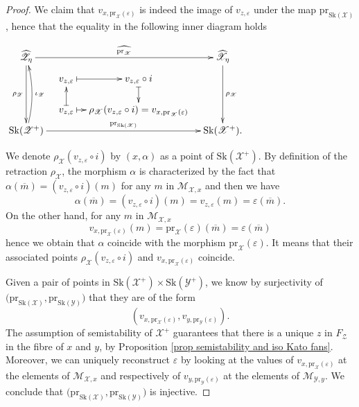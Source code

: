 \documentclass{amsart}%
\numberwithin{equation}{subsection}
\theoremstyle{plain2}
\theoremstyle{definition2}
\theoremstyle{stepstyle}
\theoremstyle{point}
\theoremstyle{subpoint}
\newcommand{\cX}{\ensuremath{\mathscr{X}}}
\newcommand{\caM}{\ensuremath{\mathcal{M}}}
\newcommand{\cY}{\ensuremath{\mathscr{Y}}}
\newcommand{\cZ}{\ensuremath{\mathscr{Z}}}
\renewcommand{\cZ}{\ensuremath{\mathscr{Z}}}
\renewcommand{\cY}{\ensuremath{\mathscr{Y}}}
\newcommand{\pr}{\mathrm{pr}}
\newcommand{\Sk}{\mathrm{Sk}}
\begin{document}
\begin{proof}
We claim that $v_{x, \pr_{\cX}(\varepsilon)}$ is indeed the image of $v_{z,\varepsilon}$ under the map $\pr_{\Sk(\cX)}$, hence that the equality in the following inner diagram holds
\begin{center} 
$\begin{gathered}
\xymatrixcolsep{0.8pc}\xymatrixrowsep{0.4pc} \xymatrix{
 \widehat{\cZ_{\eta}} \ar[rrr]^-{\widehat{\pr_{\cX}}} \ar[dddd]_{\rho_\cZ} & & & \widehat{\cX_{\eta}}\ar[dddd]^{\rho_\cX}\\
 \footnotesize & v_{z,\varepsilon} \ar@{|->}[r] &  v_{z,\varepsilon} \circ i\ar@{|->}[dd] & \\
 & & & \\
 & v_{z,\varepsilon} \ar@{|->}[uu] \ar@{|->}[r] & \rho_\cX(v_{z,\varepsilon} \circ i) = v_{x, \pr_{\cX}(\varepsilon)}& \\
 \normalsize \Sk(\cZ^+) \ar[rrr]^-{\pr_{\Sk(\cX)}} \ar@/_/[uuuu]_-{\iota_\cZ}  & & & \Sk(\cX^+).
}
\end{gathered}$\end{center} We denote $\rho_\cX(v_{z,\varepsilon} \circ i)$ by $(x,\alpha)$ as a point of $\Sk(\cX^+)$. By definition of the retraction $\rho_\cX$, the morphism $\alpha$ is characterized by the fact that $\alpha(\overline{m})= (v_{z,\varepsilon} \circ i )(m)$ for any $m$ in $\caM_{\cX,x}$ and then we have $$\alpha(\overline{m})= (v_{z,\varepsilon} \circ i )(m) = v_{z,\varepsilon}(m)= \varepsilon(\overline{m}).$$ On the other hand, for any $m$ in $\caM_{\cX,x}$ $$v_{x,\pr_{\cX}(\varepsilon)}(m)= \pr_{\cX}(\varepsilon) (\overline{m}) = \varepsilon(\overline{m})$$ hence we obtain that $\alpha$ coincide with the morphism $\pr_{\cX}(\varepsilon)$. It means that their associated points $\rho_\cX(v_{z,\varepsilon} \circ i)$ and $v_{x, \pr_{\cX}(\varepsilon)}$ coincide.

Given a pair of points in $\Sk(\cX^+) \times \Sk(\cY^+)$, we know by surjectivity of $\big(\pr_{\Sk(\cX)}, \pr_{\Sk(\cY)}\big)$  that they are of the form $$(v_{x, \pr_{\cX}(\varepsilon)}, v_{y, \pr_{\cY}(\varepsilon)}).$$ The assumption of semistability of $\cX^+$ guarantees that there is a unique $z$ in $F_\cZ$ in the fibre of $x$ and $y$, by Proposition \ref{prop semistability and iso Kato fans}. Moreover, we can uniquely reconstruct $\varepsilon$ by looking at the values of $v_{x, \pr_{\cX}(\varepsilon)}$ at the elements of $\caM_{\cX,x}$ and respectively of $v_{y, \pr_{\cY}(\varepsilon)}$ at the elements of $\caM_{\cY,y}$. We conclude that $\big(\pr_{\Sk(\cX)}, \pr_{\Sk(\cY)}\big)$  is injective.
\end{proof}
\end{document}
